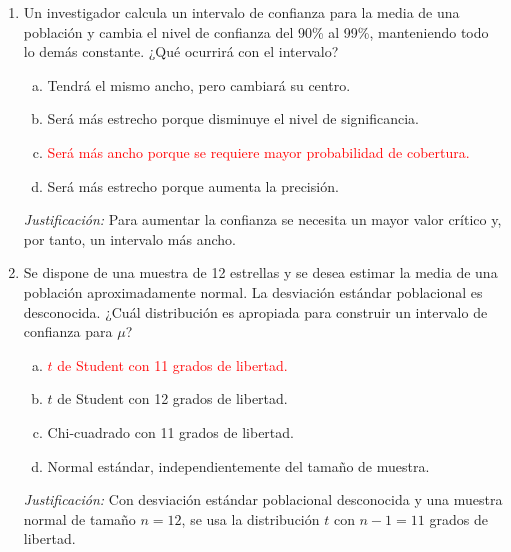 \documentclass[a4paper]{article}
\begin{document}
\begin{enumerate}
\item Un investigador calcula un intervalo de confianza para la media de una población y cambia el nivel de confianza del 90\% al 99\%, manteniendo todo lo demás constante. ¿Qué ocurrirá con el intervalo?
\begin{enumerate}[a)]
    \item Tendrá el mismo ancho, pero cambiará su centro.
    \item Será más estrecho porque disminuye el nivel de significancia.
    \item \textcolor{red}{Será más ancho porque se requiere mayor probabilidad de cobertura.}
    \item Será más estrecho porque aumenta la precisión.
\end{enumerate}
\smallskip
\textit{Justificación:} Para aumentar la confianza se necesita un mayor valor crítico y, por tanto, un intervalo más ancho.

\item Se dispone de una muestra de 12 estrellas y se desea estimar la media de una población aproximadamente normal. La desviación estándar poblacional es desconocida. ¿Cuál distribución es apropiada para construir un intervalo de confianza para $\mu$?
\begin{enumerate}[a)]
    \item \textcolor{red}{$t$ de Student con 11 grados de libertad.}
    \item $t$ de Student con 12 grados de libertad.
    \item Chi-cuadrado con 11 grados de libertad.
    \item Normal estándar, independientemente del tamaño de muestra.
\end{enumerate}
\smallskip
\textit{Justificación:} Con desviación estándar poblacional desconocida y una muestra normal de tamaño $n=12$, se usa la distribución $t$ con $n-1=11$ grados de libertad.

\end{enumerate}


\end{document}
